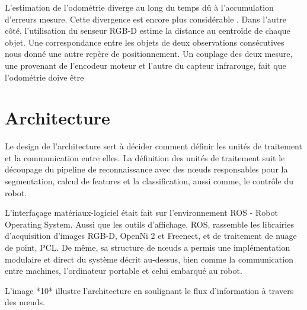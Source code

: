L'estimation de l’odométrie diverge au long du temps dû à
l'accumulation d'erreurs mesure. Cette divergence est encore plus
considérable . Dans l'autre côté, l'utilisation du senseur RGB-D
estime la distance au centroïde de chaque objet. Une correspondance
entre les objets de deux observations consécutives nous donné une
autre repère de positionnement. Un couplage des deux mesure, une
provenant de l’encodeur moteur et l'autre du capteur infrarouge, fait
que l'odométrie doive être

\section{Architecture}

Le design de l'architecture sert à décider comment définir les unités de traitement et la communication entre elles. La définition des unités de traitement suit le découpage du pipeline de reconnaissance avec des nœuds responsables pour la segmentation, calcul de features et la classification, aussi comme, le contrôle du robot.

L'interfaçage matériaux-logiciel était fait sur l'environnement ROS -
Robot Operating System. Aussi que les outils d'affichage, ROS, 
rassemble les librairies d'acquisition d'images RGB-D, OpenNi 2 et Freenect, et de traitement de nuage de point, PCL.
De même, sa structure de nœuds a permis une implémentation modulaire et direct du
système décrit au-dessus, bien comme la communication entre machines, l'ordinateur portable et celui embarqué au robot.

L'image *10* illustre l'architecture en soulignant le flux d'information à travers des nœuds.